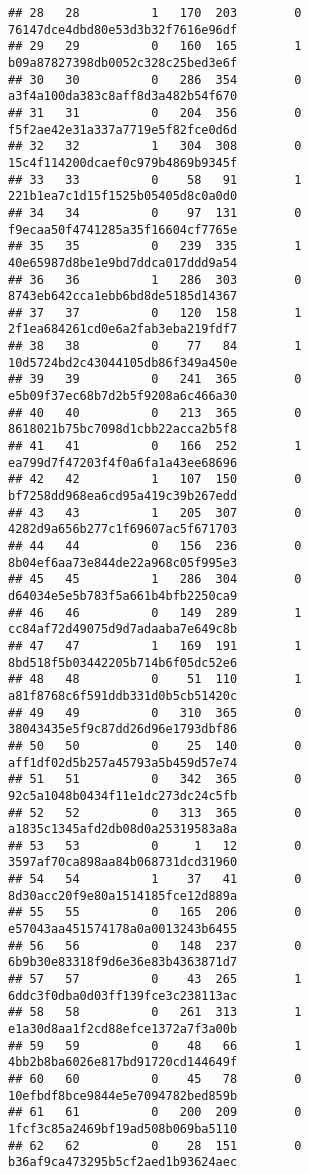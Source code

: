 \documentclass[
]{article}
\begin{document}
\begin{verbatim}
## 28   28          1   170  203        0 76147dce4dbd80e53d3b32f7616e96df
## 29   29          0   160  165        1 b09a87827398db0052c328c25bed3e6f
## 30   30          0   286  354        0 a3f4a100da383c8aff8d3a482b54f670
## 31   31          0   204  356        0 f5f2ae42e31a337a7719e5f82fce0d6d
## 32   32          1   304  308        0 15c4f114200dcaef0c979b4869b9345f
## 33   33          0    58   91        1 221b1ea7c1d15f1525b05405d8c0a0d0
## 34   34          0    97  131        0 f9ecaa50f4741285a35f16604cf7765e
## 35   35          0   239  335        1 40e65987d8be1e9bd7ddca017ddd9a54
## 36   36          1   286  303        0 8743eb642cca1ebb6bd8de5185d14367
## 37   37          0   120  158        1 2f1ea684261cd0e6a2fab3eba219fdf7
## 38   38          0    77   84        1 10d5724bd2c43044105db86f349a450e
## 39   39          0   241  365        0 e5b09f37ec68b7d2b5f9208a6c466a30
## 40   40          0   213  365        0 8618021b75bc7098d1cbb22acca2b5f8
## 41   41          0   166  252        1 ea799d7f47203f4f0a6fa1a43ee68696
## 42   42          1   107  150        0 bf7258dd968ea6cd95a419c39b267edd
## 43   43          1   205  307        0 4282d9a656b277c1f69607ac5f671703
## 44   44          0   156  236        0 8b04ef6aa73e844de22a968c05f995e3
## 45   45          1   286  304        0 d64034e5e5b783f5a661b4bfb2250ca9
## 46   46          0   149  289        1 cc84af72d49075d9d7adaaba7e649c8b
## 47   47          1   169  191        1 8bd518f5b03442205b714b6f05dc52e6
## 48   48          0    51  110        1 a81f8768c6f591ddb331d0b5cb51420c
## 49   49          0   310  365        0 38043435e5f9c87dd26d96e1793dbf86
## 50   50          0    25  140        0 aff1df02d5b257a45793a5b459d57e74
## 51   51          0   342  365        0 92c5a1048b0434f11e1dc273dc24c5fb
## 52   52          0   313  365        0 a1835c1345afd2db08d0a25319583a8a
## 53   53          0     1   12        0 3597af70ca898aa84b068731dcd31960
## 54   54          1    37   41        0 8d30acc20f9e80a1514185fce12d889a
## 55   55          0   165  206        0 e57043aa451574178a0a0013243b6455
## 56   56          0   148  237        0 6b9b30e83318f9d6e36e83b4363871d7
## 57   57          0    43  265        1 6ddc3f0dba0d03ff139fce3c238113ac
## 58   58          0   261  313        1 e1a30d8aa1f2cd88efce1372a7f3a00b
## 59   59          0    48   66        1 4bb2b8ba6026e817bd91720cd144649f
## 60   60          0    45   78        0 10efbdf8bce9844e5e7094782bed859b
## 61   61          0   200  209        0 1fcf3c85a2469bf19ad508b069ba5110
## 62   62          0    28  151        0 b36af9ca473295b5cf2aed1b93624aec

\end{verbatim}
\end{document}
